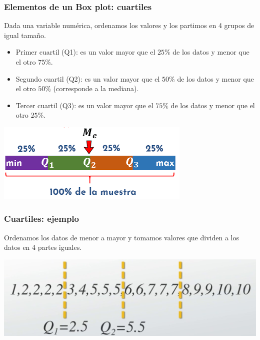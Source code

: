 \documentclass[aspectratio=169,12pt]{beamer}
\begin{document}
\begin{frame}
\frametitle{Elementos de un Box plot: cuartiles}

Dada una variable numérica, ordenamos los valores y los partimos en 4 grupos de igual tamaño.

\begin{itemize}
\item Primer cuartil (Q1): es un valor mayor que el $25\%$ de los datos y menor que el otro $75\%$.
\item Segundo cuartil (Q2): es un valor mayor que el $50\%$ de los datos y menor que el otro $50\%$ (corresponde a la mediana).
\item Tercer cuartil (Q3): es un valor mayor que el $75\%$ de los datos y menor que el otro $25\%$.
\end{itemize}

\begin{center}
\includegraphics[scale=.5]{clase4-cuartiles-esquema.png}
\end{center}




\end{frame}


\begin{frame}
\frametitle{Cuartiles: ejemplo}

Ordenamos los datos de menor a mayor y tomamos valores que dividen a los datos en 4 partes iguales.

\begin{center}
\includegraphics[scale=.3]{clase4-cuartiles-Q1yQ2.jpg}
\end{center}

\end{frame}
\end{document}
